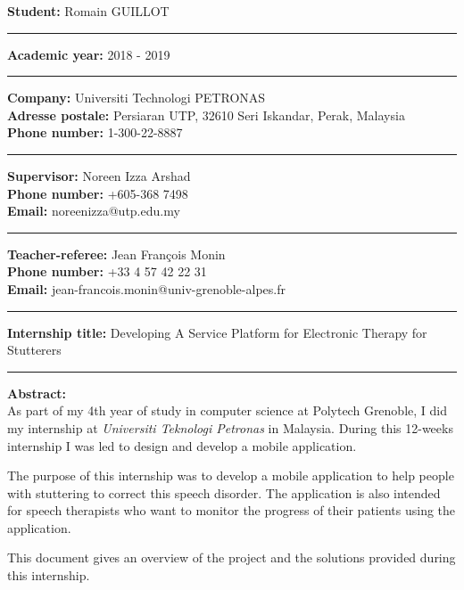 
\clearpage \ifodd\value{page}\hbox{\thispagestyle{empty}}\newpage\fi
\thispagestyle{empty}

\noindent\textbf{Student:} Romain GUILLOT

\noindent\rule{\textwidth}{1pt}

\noindent\textbf{Academic year:} 2018 - 2019

\noindent\rule{\textwidth}{1pt}

\noindent\textbf{Company:} Universiti Technologi PETRONAS \\
\noindent\textbf{Adresse postale:} Persiaran UTP, 32610 Seri Iskandar, Perak, Malaysia \\
\noindent\textbf{Phone number:} 1-300-22-8887


\noindent\rule{\textwidth}{1pt}

\noindent\textbf{Supervisor:} Noreen Izza Arshad \\
\noindent\textbf{Phone number:} +605-368 7498 \\
\noindent\textbf{Email:} noreenizza@utp.edu.my

\noindent\rule{\textwidth}{1pt}

\noindent\textbf{Teacher-referee:} Jean François Monin\\
\noindent\textbf{Phone number:} +33 4 57 42 22 31   \\
\noindent\textbf{Email:} jean-francois.monin@univ-grenoble-alpes.fr

\noindent\rule{\textwidth}{1pt}

\noindent\textbf{Internship title:} Developing A Service Platform for Electronic Therapy for Stutterers

\noindent\rule{\textwidth}{1pt}

\noindent\textbf{Abstract:}\\
As part of my 4th year of study in computer science at Polytech Grenoble, I did my internship at \textit{Universiti Teknologi Petronas} in Malaysia. During this 12-weeks internship I was led to design and develop a mobile application.

The purpose of this internship was to develop a mobile application to help people with stuttering to correct this speech disorder. The application is also intended for speech therapists who want to monitor the progress of their patients using the application.

This document gives an overview of the project and the solutions provided during this internship.
